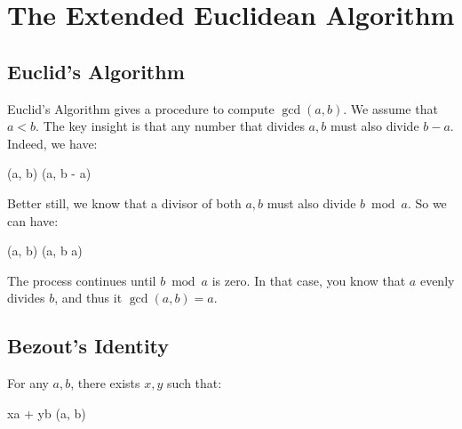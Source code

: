 \section{The Extended Euclidean Algorithm}

\subsection{Euclid's Algorithm}

Euclid's Algorithm gives a procedure to compute $\gcd(a, b)$. We assume
that $a < b$. The key insight is that any number that divides $a, b$
must also divide $b - a$. Indeed, we have:

\begin{nedqn}
  \gcd(a, b)
\eqcol
  \gcd(a, b - a)
\end{nedqn}

Better still, we know that a divisor of both $a, b$ must also divide $b
\bmod a$. So we can have:

\begin{nedqn}
  \gcd(a, b)
\eqcol
  \gcd(a, b \bmod a)
\end{nedqn}

The process continues until $b \bmod a$ is zero. In that case, you know
that $a$ evenly divides $b$, and thus it $\gcd(a, b) = a$.

\subsection{Bezout's Identity}

\begin{theorem}

  For any $a, b$, there exists $x, y$ such that:

  \begin{nedqn}
    xa + yb
  \eqcol
    \gcd(a, b)
  \end{nedqn}
\end{theorem}

